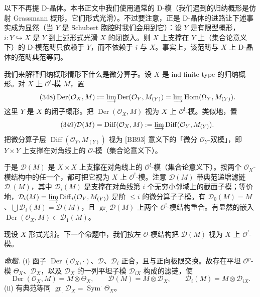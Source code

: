 

以下不再提 D-晶体。本书正文中我们使用通常的 D-模（我们遇到的归纳概形是仿射 Grassmann 概形，它们形式光滑）。不过要注意，正是 D-晶体的进路让下述事实成为显然（当 $Y$ 是 Schubert 胞腔时我们会用到它）：设 $Y$ 是有限型概形，$i:Y\hookrightarrow X$ 是 $Y$ 到上述形式光滑 $X$ 的闭嵌入。则 $X$ 上支撑在 $Y$ 上（集合论意义下）的 D-模范畴只依赖于 $Y$，而不依赖于 $i$ 与 $X$。事实上，该范畴与 $X$ 上 D-晶体的范畴典范等同。

 我们来解释归纳概形情形下什么是微分算子。设 $X$ 是 ind-finite type 的归纳概形。对 $X$ 上 $\mathcal{O}^!$-模 $M$，置
\begin{equation}\tag{348}
\operatorname{Der}(\mathcal{O}_X,M):=\varinjlim\operatorname{Der}(\mathcal{O}_Y,M_{(Y)})=\varinjlim\operatorname{Hom}(\Omega_Y,M_{(Y)}).
\end{equation}
这里 $Y$ 是 $X$ 的闭子概形。把 $\operatorname{Der}(\mathcal{O}_X,M)$ 视为 $X$ 上 $\mathcal{O}^!$-模。类似地，置
\begin{equation}\tag{349}
\mathcal{D}(M)=\operatorname{Diff}(\mathcal{O}_X,M):=\varinjlim\operatorname{Diff}(\mathcal{O}_Y,M_{(Y)}).
\end{equation}
把微分算子层 $\operatorname{Diff}(\mathcal{O}_Y,M_{(Y)})$ 视为 [BB93] 意义下的「微分 $\mathcal{O}_Y$-双模」，即 $Y\times Y$ 上支撑在对角线上的 $\mathcal{O}$-模（集合论意义下）。

于是 $\mathcal{D}(M)$ 是 $X\times X$ 上支撑在对角线上的 $\mathcal{O}^!$-模（集合论意义下）。按两个 $\mathcal{O}_X$-模结构中的任一个，都可把它视为 $X$ 上 $\mathcal{O}^!$-模。注意 $\mathcal{D}(M)$ 带典范递增滤链 $\mathcal{D}_\cdot(M)$，其中 $\mathcal{D}_i(M)$ 是支撑在对角线第 $i$ 个无穷小邻域上的截面子模；等价地，$\mathcal{D}_i(M)=\varinjlim\operatorname{Diff}_i(\mathcal{O}_Y,M_{(Y)})$ 是阶 $\le i$ 的微分算子子模。有 $\mathcal{D}_0(M)=M$、$\bigcup\mathcal{D}_i(M)=\mathcal{D}(M)$，且 $\operatorname{gr}_\cdot\mathcal{D}(M)$ 上两个 $\mathcal{O}^!$-模结构重合。有显然的嵌入 $\operatorname{Der}(\mathcal{O}_X,M)\subset\mathcal{D}_1(M)$。


现设 $X$ 形式光滑。下一个命题中，我们按左 $\mathcal{O}$-模结构把 $\mathcal{D}(M)$ 视为 $X$ 上 $\mathcal{O}^!$-模。

 \emph{命题.} (i) 函子 $\operatorname{Der}(\mathcal{O}_X,\cdot)$、$\mathcal{D}$、$\mathcal{D}_i$ 正合，且与正向极限交换。故存在平坦 $\mathcal{O}^p$-模 $\Theta_X$、$\mathcal{D}_X$，以及 $\mathcal{D}_X$ 的一列平坦子模 $\mathcal{D}_{iX}$ 构成的滤链，使
\[
\operatorname{Der}(\mathcal{O}_X,M)=M\otimes\Theta_X,\qquad\mathcal{D}(M)=M\otimes\mathcal{D}_X,\qquad\mathcal{D}_i(M)=M\otimes\mathcal{D}_{iX}.
\]
(ii) 有典范等同 $\operatorname{gr}_\cdot\mathcal{D}_X=\operatorname{Sym}^\cdot\Theta_X$。

